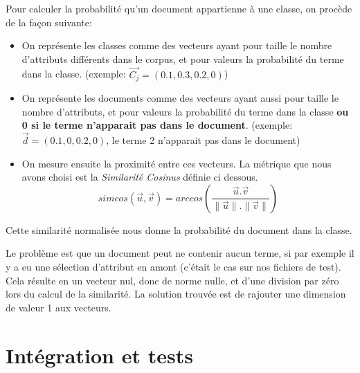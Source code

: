 \documentclass{article}
\begin{document}
\medskip
Pour calculer la probabilité qu'un document appartienne à une classe, on procède de la façon suivante:
\begin{itemize}
\item On représente les classes comme des vecteurs ayant pour taille le nombre d'attributs différents dans le corpus, et pour valeurs la probabilité du terme dans la classe. (exemple: $\vec{C_j} = (0.1,0.3,0.2,0)$)
\item On représente les documents comme des vecteurs ayant aussi pour taille le nombre d'attributs, et pour valeurs la probabilité du terme dans la classe \textbf{ou 0 si le terme n'apparait pas dans le document}. (exemple: $\vec{d} = (0.1,0,0.2,0)$, le terme 2 n'apparait pas dans le document)
\item On mesure ensuite la proximité entre ces vecteurs. La métrique que nous avons choisi est la \textit{Similarité Cosinus} définie ci dessous.
\[simcos(\vec{u},\vec{v}) = arccos( \frac{\vec{u}.\vec{v}}{\|\vec{u}\|.\|\vec{v}\|})\]
\end{itemize}
Cette similarité normalisée nous donne la probabilité du document dans la classe.

\medskip

Le problème est que un document peut ne contenir aucun terme, si par exemple il y a eu une sélection d'attribut en amont (c'était le cas sur nos fichiers de test). Cela résulte en un vecteur nul, donc de norme nulle, et d'une division par zéro lors du calcul de la similarité. La solution trouvée est de rajouter une dimension de valeur 1 aux vecteurs.




\section{Intégration et tests}
\end{document}
